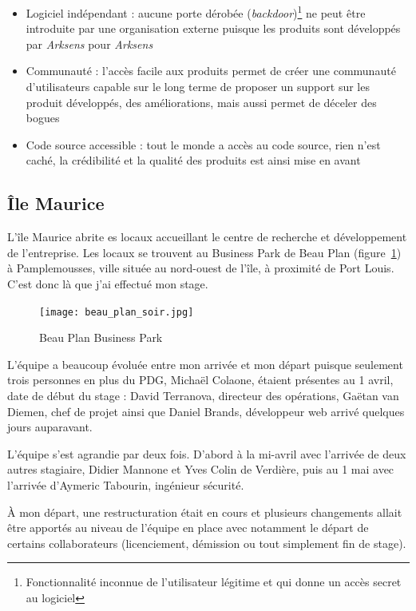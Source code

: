 \documentclass[a4paper,10pt, twoside]{report}
\begin{document}
\begin{spacing}{1.2}
\begin{itemize}
  \item Logiciel ind\'ependant : aucune porte d\'erob\'ee
  (\textit{backdoor})\footnote{Fonctionnalit\'e inconnue de l'utilisateur
  l\'egitime et qui donne un acc\`es secret au logiciel} ne peut
  \^etre introduite par une organisation externe puisque les produits sont
  d\'evelopp\'es par \textit{Arksens} pour \textit{Arksens}
  \item Communaut\'e : l'acc\`es facile aux produits permet de cr\'eer une
  communaut\'e d'utilisateurs capable sur le long terme de proposer un
  support sur les produit d\'evelopp\'es, des am\'eliorations, mais aussi
  permet de d\'eceler des bogues
  \item Code source accessible : tout le monde a acc\`es au code source,
  rien n'est cach\'e, la cr\'edibilit\'e et la qualit\'e des produits est ainsi
  mise en avant
\end{itemize}

\subsection{\^Ile Maurice}
L'\^ile Maurice abrite es locaux accueillant le centre de recherche et
d\'eveloppement de l'entreprise. Les locaux se trouvent au Business Park de
Beau Plan (figure~\ref{beauPlan}) \`a Pamplemousses, ville situ\'ee au
nord-ouest de l'\^ile, \`a proximit\'e de Port Louis. C'est donc l\`a que
j'ai effectu\'e mon stage.

\begin{figure}[h!]
  \centering
  \texttt{[image: beau\_plan\_soir.jpg]}
  \caption{\label{beauPlan} Beau Plan Business Park}
\end{figure}

L'\'equipe a beaucoup \'evolu\'ee entre mon arriv\'ee et mon d\'epart puisque
seulement trois personnes en plus du PDG, Micha\"el Colaone, \'etaient
pr\'esentes au 1 avril, date de d\'ebut du stage : David Terranova,
directeur des op\'erations, Ga\"etan van Diemen, chef de projet ainsi que
Daniel Brands, d\'eveloppeur web arriv\'e quelques jours auparavant.

L'\'equipe s'est agrandie par deux fois. D'abord \`a la mi-avril avec
l'arriv\'ee de deux autres stagiaire, Didier Mannone et
Yves Colin de Verdi\`ere, puis au 1 mai avec l'arriv\'ee d'Aymeric
Tabourin, ing\'enieur s\'ecurit\'e.

\`A mon d\'epart, une restructuration \'etait en cours et plusieurs changements
allait \^etre apport\'es au niveau de l'\'equipe en place avec notamment le
d\'epart de certains collaborateurs (licenciement, d\'emission ou tout
simplement fin de stage).


\end{spacing}
\end{document}
